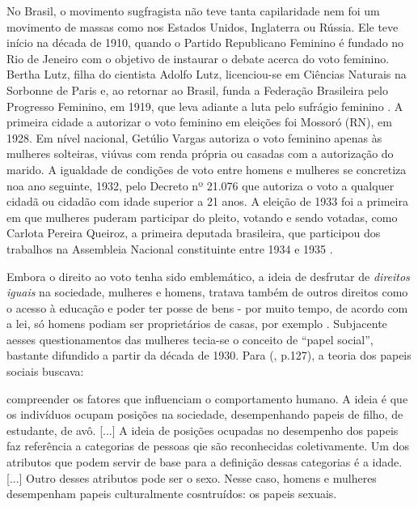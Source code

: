 No Brasil, o movimento sugfragista não teve tanta capilaridade nem foi um movimento de massas como nos Estados Unidos, Inglaterra ou Rússia. Ele teve início na década de 1910, quando o Partido Republicano Feminino é fundado no Rio de Jeneiro com o objetivo de instaurar o debate acerca do voto feminino. 
Bertha Lutz, filha do cientista Adolfo Lutz, licenciou-se em Ciências Naturais na Sorbonne de Paris e, ao retornar ao Brasil, funda a Federação Brasileira pelo Progresso Feminino, em 1919, que leva adiante a luta pelo sufrágio feminino \cite{PINSKY2003}. A primeira cidade a autorizar o voto feminino em eleições foi Mossoró (RN), em 1928. Em nível nacional, Getúlio Vargas autoriza o voto feminino apenas às mulheres solteiras, viúvas com renda própria ou casadas com a autorização do marido. A igualdade de condições de voto entre homens e mulheres se concretiza noa ano seguinte, 1932, pelo Decreto nº 21.076 que autoriza o voto a qualquer cidadã ou cidadão com idade superior a 21 anos.
A eleição de 1933 foi a primeira em que mulheres puderam participar do pleito, votando e sendo votadas, como Carlota Pereira Queiroz, a primeira deputada brasileira, que participou dos trabalhos na Assembleia Nacional constituinte entre 1934 e 1935 \cite{TABAK1989}.

Embora o direito ao voto tenha sido emblemático, a ideia de desfrutar de \emph{direitos iguais} na sociedade, mulheres e homens, tratava também de outros direitos como o acesso à educação e poder ter posse de bens - por muito tempo, de acordo com a lei, só homens podiam ser proprietários de casas, por exemplo \cite{PISCITELLI2009}. Subjacente aesses questionamentos das mulheres tecia-se o conceito de ``papel social'', bastante difundido a partir da década de 1930. Para (\citeyear{PISCITELLI2009}, p.127), a teoria dos papeis sociais buscava:

\begin{citacao}
compreender os fatores que influenciam o comportamento humano. A ideia é que os indivíduos ocupam posições na sociedade, desempenhando papeis de filho, de estudante, de avô. [...] A ideia de posições ocupadas no desempenho dos papeis faz referência a categorias de pessoas qie são reconhecidas coletivamente. Um dos atributos que podem servir de base para a definição dessas categorias é a idade. [...] Outro desses atributos pode ser o sexo. Nesse caso, homens e mulheres desempenham papeis culturalmente cosntruídos: os papeis sexuais.
\end{citacao}

